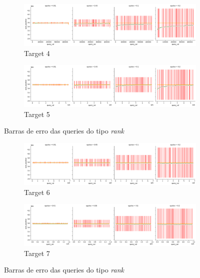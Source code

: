 \documentclass[11pt]{article}
\begin{document}
    \begin{figure}[H]
      \begin{subfigure}{.5\textwidth}
        \centering
        \includegraphics[width=.9\linewidth]{../../img/qdigest-erroplot_ecdf_RANK_t_4.png}
        \caption{Target 4}
        \label{fig:sub-first}
      \end{subfigure}
      \begin{subfigure}{.5\textwidth}
        \centering
        \includegraphics[width=.9\linewidth]{../../img/qdigest-erroplot_ecdf_RANK_t_5.png}
        \caption{Target 5}
      \end{subfigure}
      \caption{Barras de erro das queries do tipo \emph{rank}}
    \end{figure}

    \begin{figure}[H]
      \begin{subfigure}{.5\textwidth}
        \centering
        \includegraphics[width=.9\linewidth]{../../img/qdigest-erroplot_ecdf_RANK_t_6.png}
        \caption{Target 6}
        \label{fig:sub-first}
      \end{subfigure}
      \begin{subfigure}{.5\textwidth}
        \centering
        \includegraphics[width=.9\linewidth]{../../img/qdigest-erroplot_ecdf_RANK_t_7.png}
        \caption{Target 7}
      \end{subfigure}
      \caption{Barras de erro das queries do tipo \emph{rank}}
    \end{figure}
\end{document}
